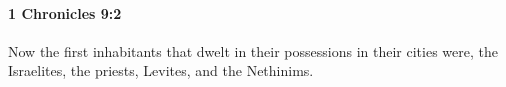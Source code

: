 
		\paragraph{1 Chronicles 9:2} %
			\label{1CHRONICLES-9-2}

			Now the first inhabitants that dwelt in their possessions in their cities were, the Israelites, the priests, Levites, and the Nethinims.


